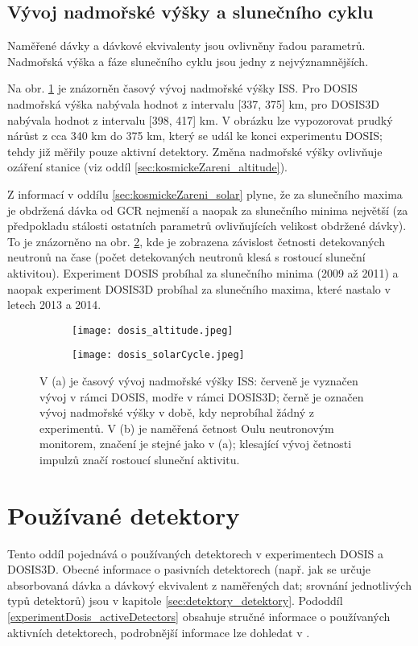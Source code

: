 \subsection{Vývoj nadmořské výšky a slunečního cyklu}\label{sec:dosis_altitudeSlunecniCyklus} %
Naměřené dávky a dávkové ekvivalenty jsou ovlivněny řadou parametrů. Nadmořská výška a fáze slunečního cyklu jsou jedny z nejvýznamnějších. 

Na obr. \ref{subfig:dosis_altitude} je znázorněn časový vývoj nadmořské výšky ISS. Pro DOSIS nadmořská výška nabývala hodnot z intervalu [337, 375] km, pro DOSIS3D nabývala hodnot z intervalu [398, 417] km. V obrázku lze vypozorovat prudký nárůst z cca 340 km do 375 km, který se udál ke konci experimentu DOSIS; tehdy již měřily pouze aktivní detektory. Změna nadmořské výšky ovlivňuje ozáření stanice (viz oddíl \ref{sec:kosmickeZareni_altitude}). 

Z informací v oddílu \ref{sec:kosmickeZareni_solar} plyne, že za slunečního maxima je obdržená dávka od GCR nejmenší a naopak za slunečního minima největší (za předpokladu stálosti ostatních parametrů ovlivňujících velikost obdržené dávky). To je znázorněno na obr. \ref{subfig:dosis_solarCycle}, kde je zobrazena závislost četnosti detekovaných neutronů na čase (počet detekovaných neutronů klesá s rostoucí sluneční aktivitou). Experiment DOSIS probíhal za slunečního minima (2009 až 2011) a naopak experiment DOSIS3D probíhal za slunečního maxima, které nastalo v letech 2013 a 2014.   
\begin{figure}[h]
  \centering
  \begin{subfigure}{0.45\textwidth}
	\texttt{[image: dosis\_altitude.jpeg]}
	\caption{}
	\label{subfig:dosis_altitude}
  \end{subfigure}
  \begin{subfigure}{0.45\textwidth}
	\texttt{[image: dosis\_solarCycle.jpeg]}
	\caption{}
	\label{subfig:dosis_solarCycle}
  \end{subfigure}
  \caption{V (a) je časový vývoj nadmořské výšky ISS: červeně je vyznačen vývoj v rámci DOSIS, modře v rámci DOSIS3D; černě je označen vývoj nadmořské výšky v době, kdy neprobíhal žádný z experimentů. V (b) je naměřená četnost Oulu neutronovým monitorem, značení je stejné jako v (a); klesající vývoj četnosti impulzů značí rostoucí sluneční aktivitu. \cite{dosis}} 
  \label{fig:dosis_parameters}
\end{figure}

\section{Používané detektory}%
Tento oddíl pojednává o používaných detektorech v experimentech DOSIS a DOSIS3D. Obecné informace o pasivních detektorech (např. jak se určuje absorbovaná dávka a dávkový ekvivalent z naměřených dat; srovnání jednotlivých typů detektorů) jsou v kapitole \ref{sec:detektory_detektory}. Pododdíl \ref{experimentDosis_activeDetectors} obsahuje stručné informace o používaných aktivních detektorech, podrobnější informace lze dohledat v \cite{activeDetectors,dosis2}.

